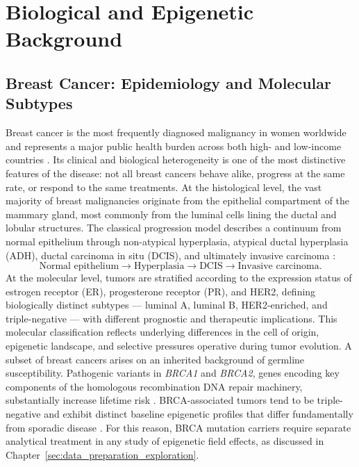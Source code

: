 \chapter{Biological and Epigenetic Background}
\label{chap:biological_background}

\section{Breast Cancer: Epidemiology and Molecular Subtypes}

Breast cancer is the most frequently diagnosed malignancy in women worldwide and
represents a major public health burden across both high- and low-income countries
\cite{Hanahan2011}. Its clinical and biological heterogeneity is one of the most
distinctive features of the disease: not all breast cancers behave alike, progress
at the same rate, or respond to the same treatments.
At the histological level, the vast majority of breast malignancies originate from
the epithelial compartment of the mammary gland, most commonly from the luminal
cells lining the ductal and lobular structures. The classical progression model
describes a continuum from normal epithelium through non-atypical hyperplasia,
atypical ductal hyperplasia (ADH), ductal carcinoma in situ (DCIS), and ultimately
invasive carcinoma \cite{Hanahan2000}:
\[
\text{Normal epithelium} \rightarrow
\text{Hyperplasia} \rightarrow
\text{DCIS} \rightarrow
\text{Invasive carcinoma}.
\]
At the molecular level, tumors are stratified according to the expression status of
estrogen receptor (ER), progesterone receptor (PR), and HER2, defining biologically
distinct subtypes — luminal A, luminal B, HER2-enriched, and triple-negative — with
different prognostic and therapeutic implications. This molecular classification
reflects underlying differences in the cell of origin, epigenetic landscape, and
selective pressures operative during tumor evolution.
A subset of breast cancers arises on an inherited background of germline susceptibility.
Pathogenic variants in \textit{BRCA1} and \textit{BRCA2}, genes encoding key
components of the homologous recombination DNA repair machinery, substantially
increase lifetime risk \cite{NCI_BRCA}. BRCA-associated tumors tend to be
triple-negative and exhibit distinct baseline epigenetic profiles that differ
fundamentally from sporadic disease \cite{Suijkerbuijk2008,Bartlett2022}.
For this reason, BRCA mutation carriers require separate analytical treatment in
any study of epigenetic field effects, as discussed in Chapter~\ref{sec:data_preparation_exploration}.

